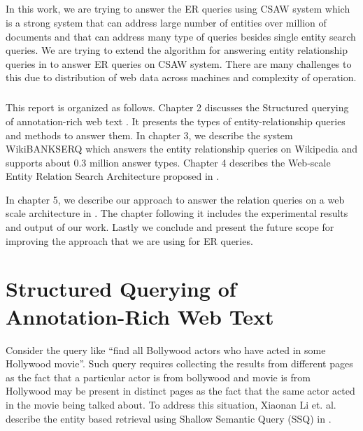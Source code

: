 \documentclass[11pt]{report}
\begin{document}
\paragraph*{}
In this work, we are trying to answer the ER queries using CSAW system which is a strong 
system that can address large number of entities over million of documents and that can address many type of queries besides single entity search queries. We are trying
to extend the algorithm for answering entity relationship queries in \cite{wikibanks} to answer ER queries on CSAW system. There are many challenges to this due to 
distribution of web data across machines and complexity of operation.


\paragraph*{}
This report is organized as follows. Chapter 2 discusses the Structured querying of annotation-rich web text \cite{ssq}. It presents the types of entity-relationship
queries and methods to answer them. In chapter 3, we describe the system WikiBANKSERQ \cite{wikibanks} which answers the entity relationship queries on Wikipedia 
and supports about 0.3 million answer types. Chapter 4 describes the Web-scale Entity Relation Search Architecture proposed in \cite{csaw}. 

In chapter 5, we describe our approach to answer the relation queries \cite{ssq} on a web scale architecture in \cite{csaw}. The chapter following it includes
the experimental results and output of our work. Lastly we conclude and present the future scope for improving the approach that we are using for ER queries.


\chapter{Structured Querying of Annotation-Rich Web Text}
Consider the query like ``find all Bollywood actors who have acted in some Hollywood movie''. Such query requires collecting the results from different pages
as the fact that a particular actor is from bollywood and movie is from Hollywood may be present in distinct pages as the fact that the same actor acted in the movie 
being talked about. To address this situation, Xiaonan Li et. al. describe the entity based 
retrieval using Shallow Semantic Query (SSQ) in \cite{ssq}.
\end{document}
